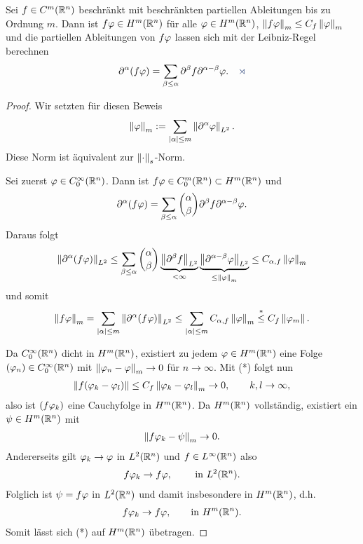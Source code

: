 \begin{lem}
\label{prop:1.8}
Sei $f\in C^m(\mathbb{R}^n)$ beschränkt mit beschränkten partiellen Ableitungen bis zu
Ordnung $m$. Dann ist $f\varphi\in H^m(\mathbb{R}^n)$ für alle $\varphi\in H^m(\mathbb{R}^n)$,
$\left\|f\varphi\right\|_m \le C_f\left\|\varphi\right\|_m$ und die partiellen Ableitungen von $f\varphi$
lassen sich mit der Leibniz-Regel berechnen
\begin{align*}
\partial^\alpha (f\ph) = \sum_{\beta\le \alpha}\partial^\beta
f\partial^{\alpha-\beta} \ph.\fishhere
\end{align*}
\end{lem}
\begin{proof}
Wir setzten für diesen Beweis
\begin{align*}
\left\|\varphi\right\|_m := \sum_{\left|\alpha\right|\le m} \left\|\partial^\alpha \varphi\right\|_{L^2}.
\end{align*}
Diese Norm ist äquivalent zur $\left\|\cdot\right\|_s$-Norm.

Sei zuerst $\varphi\in C_0^\infty(\mathbb{R}^n)$. Dann ist $f\varphi \in C_0^m(\mathbb{R}^n)\subset
H^m(\mathbb{R}^n)$ und
\begin{align*}
\partial^\alpha(f\varphi) = \sum_{\beta\le \alpha} \binom{\alpha}{\beta}
\partial^\beta f\partial^{\alpha-\beta} \varphi.
\end{align*}
Daraus folgt
\begin{align*}
\left\|\partial^\alpha (f\varphi)\right\|_{L^2} \le
\sum_{\beta\le \alpha} \binom{\alpha}{\beta}
\underbrace{\left\|\partial^\beta
f\right\|_{L^2}}_{<\infty}\underbrace{\left\|\partial^{\alpha-\beta}\varphi\right\|_{L^2}}_{\le
\left\|\varphi\right\|_m} \le C_{\alpha,f}\left\|\varphi\right\|_m
\end{align*}
und somit
\begin{align*}
\left\|f\varphi\right\|_m = \sum_{\left|\alpha\right|\le m}\left\|\partial^\alpha (f\varphi)\right\|_{L^2} \le
\sum_{\left|\alpha\right|\le m} C_{\alpha,f}\left\|\varphi\right\|_m \overset{*}{\le} C_f
\left\|\varphi_m\right\|.
\end{align*}

Da $C_0^\infty(\mathbb{R}^n)$ dicht in $H^m(\mathbb{R}^n)$, existiert zu jedem $\varphi\in
H^m(\mathbb{R}^n)$ eine Folge $(\varphi_n)\in C_0^\infty(\mathbb{R}^n)$ mit $\left\|\varphi_n-\varphi\right\|_m \to
0$ für $n\to\infty$. Mit (*) folgt nun
\begin{align*}
\left\|f(\varphi_k-\varphi_l)\right\| \le C_f\left\|\varphi_k-\varphi_l\right\|_m \to 0,\qquad k,l\to\infty,
\end{align*}
also ist $(f\varphi_k)$ eine Cauchyfolge in $H^m(\mathbb{R}^n)$. Da $H^m(\mathbb{R}^n)$
vollständig, existiert ein $\psi\in H^m(\mathbb{R}^n)$ mit
\begin{align*}
\left\|f\varphi_k - \psi\right\|_m \to 0.
\end{align*}
Andererseits gilt $\varphi_k \to \varphi$ in $L^2(\mathbb{R}^n)$ und $f\in L^\infty(\mathbb{R}^n)$ also
\begin{align*}
f\varphi_k \to f\varphi,\qquad \text{ in } L^2(\mathbb{R}^n).
\end{align*}
Folglich ist $\psi = f\varphi$ in $L^2(\mathbb{R}^n)$ und damit insbesondere in
$H^m(\mathbb{R}^n)$, d.h.
\begin{align*}
f\varphi_k \to f\varphi,\qquad \text{in } H^m(\mathbb{R}^n).
\end{align*}
Somit lässt sich (*) auf $H^m(\mathbb{R}^n)$ übetragen.


\end{proof}
